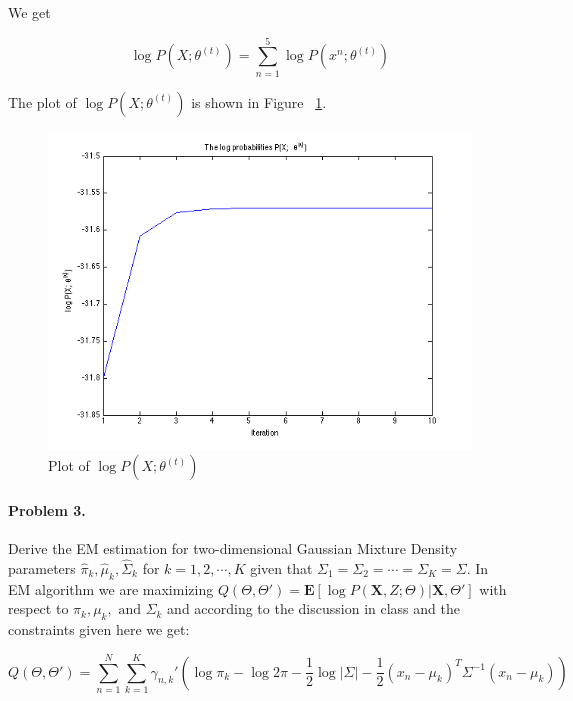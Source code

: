 \documentclass[a4paper]{article}
\begin{document}
We get 

\begin{equation}
	\log P(X; \theta^{(t)}) = \sum_{n=1}^5 \log P(x^n; \theta^{(t)})
\end{equation}

The plot of $\log P(X; \theta^{(t)})$ is shown in Figure ~\ref{fig:log_P_X}.

\begin{figure}[H]
  \centering
    \includegraphics[scale=.57]{images/log_P_X.png}
  \caption{Plot of $\log P(X; \theta^{(t)})$}
  \label{fig:log_P_X}
\end{figure}

\paragraph{Problem 3.} Derive the EM estimation for two-dimensional Gaussian Mixture Density parameters $\hat{\pi}_k, \hat{\mu}_k, \hat{\Sigma}_k$ for $k = 1,2,\cdots,K$ given that $\Sigma_1 = \Sigma_2 = \cdots = \Sigma_K = \Sigma$. In EM algorithm we are maximizing $Q(\Theta, \Theta') = \mathbf{E} [ \log P(\mathbf{X}, Z; \Theta) | \mathbf{X}, \Theta']$ with respect to $\pi_k, \mu_k, \text{ and } \Sigma_k$ and according to the discussion in class and the constraints given here we get:

\begin{equation}
	Q(\Theta, \Theta') = \sum_{n=1}^N \sum_{k=1}^K \gamma_{n,k}' \left( \log \pi_k - \log 2\pi - \frac{1}{2}\log |\Sigma| - \frac{1}{2}(x_n-\mu_k)^T\Sigma^{-1}(x_n-\mu_k) \right)
\end{equation}
\end{document}
